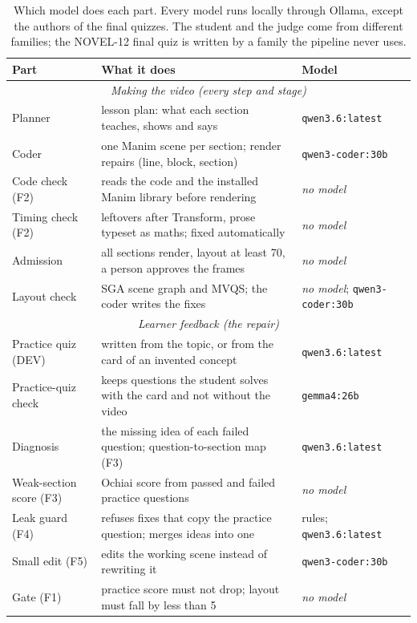 \begin{table}[t]\centering\footnotesize
\caption{Which model does each part. Every model runs locally through Ollama, except the authors of the final quizzes. The student and the judge come from different families; the NOVEL-12 final quiz is written by a family the pipeline never uses.}\label{tab:models}
\begin{tabular}{@{}lp{9.2cm}l@{}}\toprule Part & What it does & Model\\
\midrule
\multicolumn{3}{c}{\textit{Making the video (every step and stage)}}\\
Planner & lesson plan: what each section teaches, shows and says & \texttt{qwen3.6:latest} \\
Coder & one Manim scene per section; render repairs (line, block, section) & \texttt{qwen3-coder:30b} \\
Code check (F2) & reads the code and the installed Manim library before rendering & \textit{no model} \\
Timing check (F2) & leftovers after Transform, prose typeset as maths; fixed automatically & \textit{no model} \\
Admission & all sections render, layout at least 70, a person approves the frames & \textit{no model} \\
Layout check & SGA scene graph and MVQS; the coder writes the fixes & \textit{no model}; \texttt{qwen3-coder:30b} \\
\midrule
\multicolumn{3}{c}{\textit{Learner feedback (the repair)}}\\
Practice quiz (DEV) & written from the topic, or from the card of an invented concept & \texttt{qwen3.6:latest} \\
Practice-quiz check & keeps questions the student solves with the card and not without the video & \texttt{gemma4:26b} \\
Diagnosis & the missing idea of each failed question; question-to-section map (F3) & \texttt{qwen3.6:latest} \\
Weak-section score (F3) & Ochiai score from passed and failed practice questions & \textit{no model} \\
Leak guard (F4) & refuses fixes that copy the practice question; merges ideas into one & rules; \texttt{qwen3.6:latest} \\
Small edit (F5) & edits the working scene instead of rewriting it & \texttt{qwen3-coder:30b} \\
Gate (F1) & practice score must not drop; layout must fall by less than 5 & \textit{no model} \\

\end{tabular}
\end{table}
